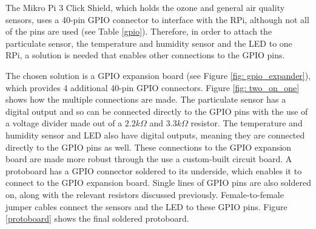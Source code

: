 \documentclass[11pt,twosided,a4paper]{report}
\begin{document}
The Mikro Pi 3 Click Shield, which holds the ozone and general air quality sensors, uses a 40-pin GPIO connector to interface with the RPi, although not all of the pins are used (see Table \ref{gpio}). Therefore, in order to attach the particulate sensor, the temperature and humidity sensor and the LED to one RPi, a solution is needed that enables other connections to the GPIO pins.

The chosen solution is a GPIO expansion board (see Figure \ref{fig: gpio_expander}), which provides 4 additional 40-pin GPIO connectors. Figure \ref{fig: two_on_one} shows how the multiple connections are made. The particulate sensor has a digital output and so can be connected directly to the GPIO pins with the use of a voltage divider made out of a $2.2k\Omega$ and $3.3k\Omega$ resistor. The temperature and humidity sensor and LED also have digital outputs, meaning they are connected directly to the GPIO pins as well. These connections to the GPIO expansion board are made more robust through the use a custom-built circuit board. A protoboard has a GPIO connector soldered to its underside, which enables it to connect to the GPIO expansion board. Single lines of GPIO pins are also soldered on, along with the relevant resistors discussed previously. Female-to-female jumper cables connect the sensors and the LED to these GPIO pins. Figure \ref{protoboard} shows the final soldered protoboard.
\end{document}
